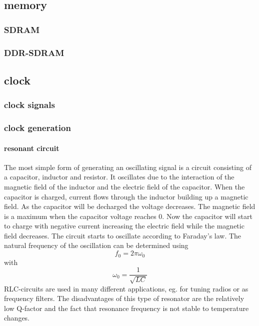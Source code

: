 \subsection{memory}

\subsubsection{SDRAM}
\subsubsection{DDR-SDRAM}
\subsection{clock}

\subsubsection{clock signals}
\subsubsection{clock generation}
\paragraph{resonant circuit\\}
The most simple form of generating an oscillating signal is a circuit consisting of a capacitor, inductor and resistor. It oscillates due to the interaction of the magnetic field of the inductor and the electric field of the capacitor. When the capacitor is charged, current flows through the inductor building up a magnetic field. As the capacitor will be decharged the voltage decreases. The magnetic field is a maximum when the capacitor voltage reaches 0. Now the capacitor will start to charge with negative current increasing the electric field while the magnetic field decreases. The circuit starts to oscillate according to Faraday's law. The natural frequency of the oscillation can be determined using
\begin{equation}
f_0=2\pi\omega_0
\end{equation}
with
\begin{equation}
\omega_0=\frac{1}{\sqrt{LC}}
\end{equation}
RLC-circuits are used in many different applications, eg. for tuning radios or as frequency filters. The disadvantages of this type of resonator are the relatively low Q-factor and the fact that resonance frequency is not stable to temperature changes.
